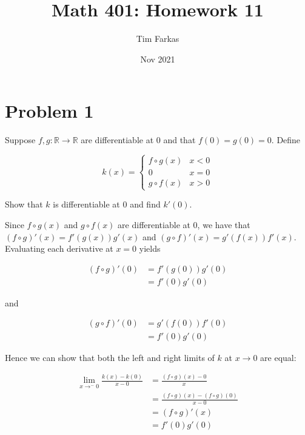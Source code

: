 \documentclass{article}
\title{Math 401: Homework 11}
\author{Tim Farkas}
\date{Nov 2021}
\begin{document}
\maketitle

\section*{Problem 1}

Suppose $f, g: \mathbb{R} \rightarrow \mathbb{R}$ are differentiable at 0 and that $f(0) = g(0) = 0$. Define

\begin{equation*}
        k(x) = \left\{
\begin{array}{ll}
        f\circ g(x) & x<0 \\
        0 & x = 0 \\
        g \circ f(x) & x > 0
\end{array}\right.
\end{equation*}

Show that $k$ is differentiable at 0 and find $k'(0)$. 

Since $f \circ g (x)$ and $g \circ f(x)$ are differentiable at 0, we have that $(f\circ g)'(x) = f'(g(x))g'(x)$ and $(g \circ f)'(x) = g'(f(x))f'(x)$. Evaluating each derivative at $x = 0$ yields

\begin{align*}
        (f \circ g)'(0) &= f'(g(0))g'(0)\\
        &= f'(0)g'(0)
\end{align*}

and 

\begin{align*}
        (g \circ f)'(0) &= g'(f(0))f'(0)\\
        &= f'(0)g'(0)
\end{align*}

Hence we can show that both the left and right limits of $k$ at $x \rightarrow 0$ are equal: 

\begin{align*}
        \lim_{x \rightarrow ^-0} \frac{k(x) - k(0)}{x - 0} &= \frac{(f \circ g)(x) - 0}{x} \\
                                                           &= \frac{(f \circ g)(x) - (f \circ g)(0)}{x - 0} \\
                                                           &= (f \circ g)'(x) \\
                                                           &= f'(0)g'(0)
\end{align*}
\end{document}
